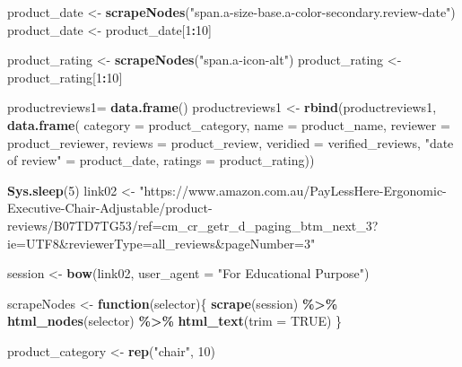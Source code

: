 \documentclass[
]{article}
\newenvironment{Shaded}{\begin{snugshade}}{\end{snugshade}}
\newcommand{\AttributeTok}[1]{\textcolor[rgb]{0.13,0.29,0.53}{#1}}
\newcommand{\ConstantTok}[1]{\textcolor[rgb]{0.56,0.35,0.01}{#1}}
\newcommand{\ControlFlowTok}[1]{\textcolor[rgb]{0.13,0.29,0.53}{\textbf{#1}}}
\newcommand{\DecValTok}[1]{\textcolor[rgb]{0.00,0.00,0.81}{#1}}
\newcommand{\FunctionTok}[1]{\textcolor[rgb]{0.13,0.29,0.53}{\textbf{#1}}}
\newcommand{\NormalTok}[1]{#1}
\newcommand{\OtherTok}[1]{\textcolor[rgb]{0.56,0.35,0.01}{#1}}
\newcommand{\SpecialCharTok}[1]{\textcolor[rgb]{0.81,0.36,0.00}{\textbf{#1}}}
\newcommand{\StringTok}[1]{\textcolor[rgb]{0.31,0.60,0.02}{#1}}
\begin{document}
\begin{Shaded}
\begin{Highlighting}[]
\NormalTok{  product\_date }\OtherTok{\textless{}{-}} \FunctionTok{scrapeNodes}\NormalTok{(}\StringTok{"span.a{-}size{-}base.a{-}color{-}secondary.review{-}date"}\NormalTok{)}
\NormalTok{  product\_date }\OtherTok{\textless{}{-}}\NormalTok{ product\_date[}\DecValTok{1}\SpecialCharTok{:}\DecValTok{10}\NormalTok{]}
  
\NormalTok{  product\_rating }\OtherTok{\textless{}{-}} \FunctionTok{scrapeNodes}\NormalTok{(}\StringTok{"span.a{-}icon{-}alt"}\NormalTok{)}
\NormalTok{  product\_rating }\OtherTok{\textless{}{-}}\NormalTok{ product\_rating[}\DecValTok{1}\SpecialCharTok{:}\DecValTok{10}\NormalTok{]}
  
\NormalTok{  productreviews1}\OtherTok{=} \FunctionTok{data.frame}\NormalTok{()}
\NormalTok{  productreviews1 }\OtherTok{\textless{}{-}} \FunctionTok{rbind}\NormalTok{(productreviews1, }\FunctionTok{data.frame}\NormalTok{(}
                      \AttributeTok{category =}\NormalTok{ product\_category,}
                      \AttributeTok{name =}\NormalTok{ product\_name,}
                      \AttributeTok{reviewer =}\NormalTok{ product\_reviewer,}
                      \AttributeTok{reviews =}\NormalTok{ product\_review,}
                      \AttributeTok{veridied =}\NormalTok{ verified\_reviews,}
                      \StringTok{"date of review"} \OtherTok{=}\NormalTok{ product\_date,}
                      \AttributeTok{ratings =}\NormalTok{ product\_rating))}

  
\FunctionTok{Sys.sleep}\NormalTok{(}\DecValTok{5}\NormalTok{)}
\NormalTok{link02 }\OtherTok{\textless{}{-}} \StringTok{"https://www.amazon.com.au/PayLessHere{-}Ergonomic{-}Executive{-}Chair{-}Adjustable/product{-}reviews/B07TD7TG53/ref=cm\_cr\_getr\_d\_paging\_btm\_next\_3?ie=UTF8\&reviewerType=all\_reviews\&pageNumber=3"}


\NormalTok{  session }\OtherTok{\textless{}{-}} \FunctionTok{bow}\NormalTok{(link02,}
               \AttributeTok{user\_agent =} \StringTok{"For Educational Purpose"}\NormalTok{)}

\NormalTok{  scrapeNodes }\OtherTok{\textless{}{-}} \ControlFlowTok{function}\NormalTok{(selector)\{}
    \FunctionTok{scrape}\NormalTok{(session) }\SpecialCharTok{\%\textgreater{}\%}
      \FunctionTok{html\_nodes}\NormalTok{(selector) }\SpecialCharTok{\%\textgreater{}\%}
      \FunctionTok{html\_text}\NormalTok{(}\AttributeTok{trim =} \ConstantTok{TRUE}\NormalTok{)}
\NormalTok{  \}}

\NormalTok{  product\_category }\OtherTok{\textless{}{-}} \FunctionTok{rep}\NormalTok{(}\StringTok{"chair"}\NormalTok{, }\DecValTok{10}\NormalTok{)}


\end{Highlighting}
\end{Shaded}
\end{document}
